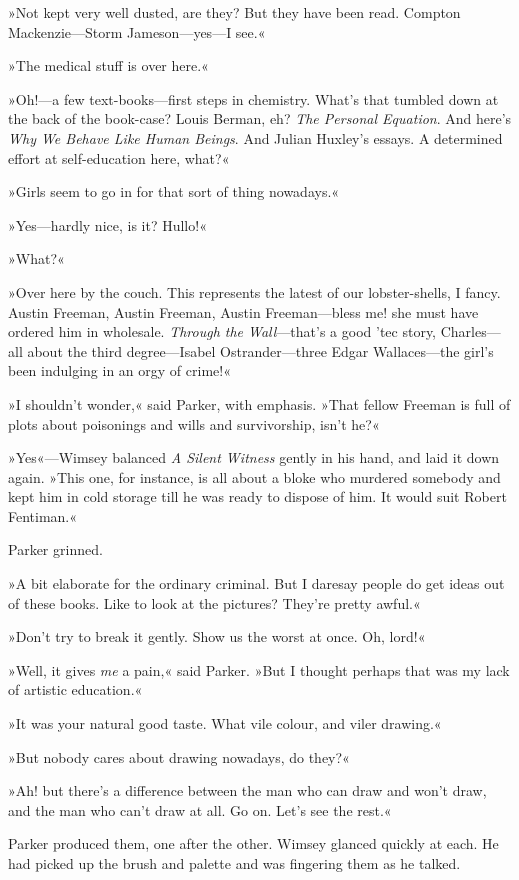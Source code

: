 »Not kept very well dusted, are they? But they have been read. Compton Mackenzie—Storm Jameson—yes—I see.«

»The medical stuff is over here.«

»Oh!—a few text-books—first steps in chemistry. What's that tumbled down at the back of the book-case? Louis Berman, eh? \textit{The Personal Equation}. And here's \textit{Why We Behave Like Human Beings}. And Julian Huxley's essays. A determined effort at self-education here, what?«

»Girls seem to go in for that sort of thing nowadays.«

»Yes—hardly nice, is it? Hullo!«

»What?«

»Over here by the couch. This represents the latest of our lobster-shells, I fancy. Austin Freeman, Austin Freeman, Austin Freeman—bless me! she must have ordered him in wholesale. \textit{Through the Wall}—that's a good 'tec story, Charles—all about the third degree—Isabel Ostrander—three Edgar Wallaces—the girl's been indulging in an orgy of crime!«

»I shouldn't wonder,« said Parker, with emphasis. »That fellow Freeman is full of plots about poisonings and wills and survivorship, isn't he?«

»Yes«—Wimsey balanced \textit{A Silent Witness} gently in his hand, and laid it down again. »This one, for instance, is all about a bloke who murdered somebody and kept him in cold storage till he was ready to dispose of him. It would suit Robert Fentiman.«

Parker grinned.

»A bit elaborate for the ordinary criminal. But I daresay people do get ideas out of these books. Like to look at the pictures? They're pretty awful.«

»Don't try to break it gently. Show us the worst at once\textellipsis. Oh, lord!«

»Well, it gives \textit{me} a pain,« said Parker. »But I thought perhaps that was my lack of artistic education.«

»It was your natural good taste. What vile colour, and viler drawing.«

»But nobody cares about drawing nowadays, do they?«

»Ah! but there's a difference between the man who can draw and won't draw, and the man who can't draw at all. Go on. Let's see the rest.«

Parker produced them, one after the other. Wimsey glanced quickly at each. He had picked up the brush and palette and was fingering them as he talked.

